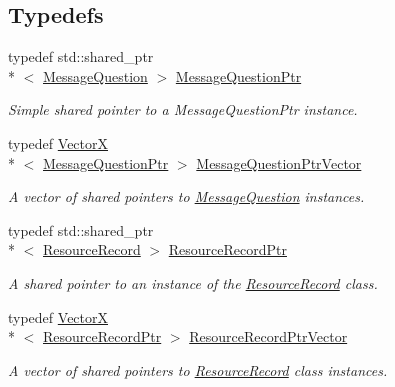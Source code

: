 \subsection*{Typedefs}
\begin{DoxyCompactItemize}
\item 
typedef std\-::shared\-\_\-ptr\\*
$<$ \hyperlink{class_senergy_1_1_dns_1_1_message_question}{Message\-Question} $>$ \hyperlink{namespace_senergy_1_1_dns_a425a2a6f3b5c18973c524a99bdfa4ef0}{Message\-Question\-Ptr}
\begin{DoxyCompactList}\small\item\em Simple shared pointer to a Message\-Question\-Ptr instance. \end{DoxyCompactList}\item 
typedef \hyperlink{class_senergy_1_1_vector_x}{Vector\-X}\\*
$<$ \hyperlink{namespace_senergy_1_1_dns_a425a2a6f3b5c18973c524a99bdfa4ef0}{Message\-Question\-Ptr} $>$ \hyperlink{namespace_senergy_1_1_dns_a6983ff2422cfa510ca61831ae5cf1ffc}{Message\-Question\-Ptr\-Vector}
\begin{DoxyCompactList}\small\item\em A vector of shared pointers to \hyperlink{class_senergy_1_1_dns_1_1_message_question}{Message\-Question} instances. \end{DoxyCompactList}\item 
typedef std\-::shared\-\_\-ptr\\*
$<$ \hyperlink{class_senergy_1_1_dns_1_1_resource_record}{Resource\-Record} $>$ \hyperlink{namespace_senergy_1_1_dns_a1fa04259a07ce7a270e09288aa456ffd}{Resource\-Record\-Ptr}
\begin{DoxyCompactList}\small\item\em A shared pointer to an instance of the \hyperlink{class_senergy_1_1_dns_1_1_resource_record}{Resource\-Record} class. \end{DoxyCompactList}\item 
typedef \hyperlink{class_senergy_1_1_vector_x}{Vector\-X}\\*
$<$ \hyperlink{namespace_senergy_1_1_dns_a1fa04259a07ce7a270e09288aa456ffd}{Resource\-Record\-Ptr} $>$ \hyperlink{namespace_senergy_1_1_dns_ad5ef448b2b508ce86c6ed91dccc10d3e}{Resource\-Record\-Ptr\-Vector}
\begin{DoxyCompactList}\small\item\em A vector of shared pointers to \hyperlink{class_senergy_1_1_dns_1_1_resource_record}{Resource\-Record} class instances. \end{DoxyCompactList}\end{DoxyCompactItemize}
